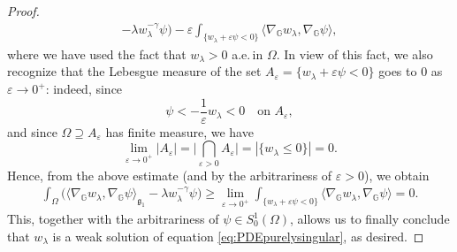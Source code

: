 \documentclass[11pt]{amsart}
\numberwithin{equation}{section} %
\theoremstyle{definition}
\begin{document}
\begin{proof}
\begin{align*}
			 - {\lambda} w_\lambda^{-\gamma}\psi\big) 
			 - \varepsilon\int_{\{w_\lambda+\varepsilon\psi< 0\}}\langle\nabla_\mathbb{G}w_\lambda,\nabla_\mathbb{G}\psi\rangle, 
			  \end{align*}
			 where we have used the fact that $w_\lambda > 0$ a.e.\,in $\Omega$. 
			 In view of this fact, we also recognize that the Lebesgue measure of the set $A_\varepsilon = \{w_\lambda+\varepsilon\psi< 0\}$
			 goes to $0$ as $\varepsilon\to 0^+$: indeed, since
			 $$\psi < -\frac{1}{\varepsilon}w_\lambda < 0\quad\text{on $A_\varepsilon$},$$
			 and since $\Omega\supseteq A_\varepsilon$ has finite measure, we have
			 $$\lim_{\varepsilon\to 0^+}|A_\varepsilon| = 
			 \Big|\bigcap_{\varepsilon > 0}A_\varepsilon\Big| = |\{w_\lambda\leq 0\}| = 0.$$
			 Hence, from the above estimate
			 (and by the arbitrariness of $\varepsilon > 0$), we obtain
			 \begin{align*}
			 	\int_\Omega\big(\langle\nabla_\mathbb{G}w_\lambda,\nabla_\mathbb{G}\psi\rangle_{\mathfrak{g}_{1}}
			 - {\lambda} w_\lambda^{-\gamma}\psi\big) 
			\geq \lim_{\varepsilon\to 0^+}\int_{\{w_\lambda+\varepsilon\psi< 0\}}\langle\nabla_\mathbb{G}w_\lambda,\nabla_\mathbb{G}\psi\rangle = 0.
			 \end{align*}
			 This, together with the arbitrariness of
			 $\psi \in S_0^1(\Omega)$, allows us to finally conclude that 
			 $w_\lambda$ is a weak solution of equation
			 \eqref{eq:PDEpurelysingular}, as desired.
			 			 \medskip
			 

\end{proof}
\end{document}
